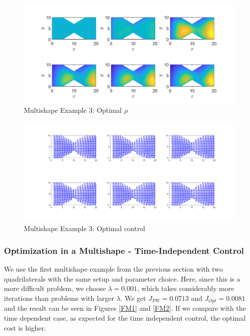 \documentclass[11pt, a4paper]{article}
\theoremstyle{definition}
\begin{document}
\begin{figure}[h]
	\centering
	\includegraphics[scale=0.35]{MultiOpt3.png}
	\caption{Multishape Example 3: Optimal $\rho$} 
	\label{FM3a}
\end{figure}
\begin{figure}[h]
	\centering
	\includegraphics[scale=0.35]{MultiCont3.png}
	\caption{Multishape Example 3: Optimal control} 
	\label{FM3b}
\end{figure}
\subsubsection{Optimization in a Multishape - Time-Independent Control}
We use the first multishape example from the previous section with two quadrilaterals with the same setup and parameter choice. Here, since this is a more difficult problem, we choose $\lambda = 0.001$, which takes considerably more iterations than problems with larger $\lambda$.
We get $J_{FW} = 0.0713$ and $J_{Opt} = 0.0081$ and the result can be seen in Figures \ref{FM1} and \ref{FM2}. If we compare with the time dependent case, as expected for the time independent control, the optimal cost is higher.
\end{document}
